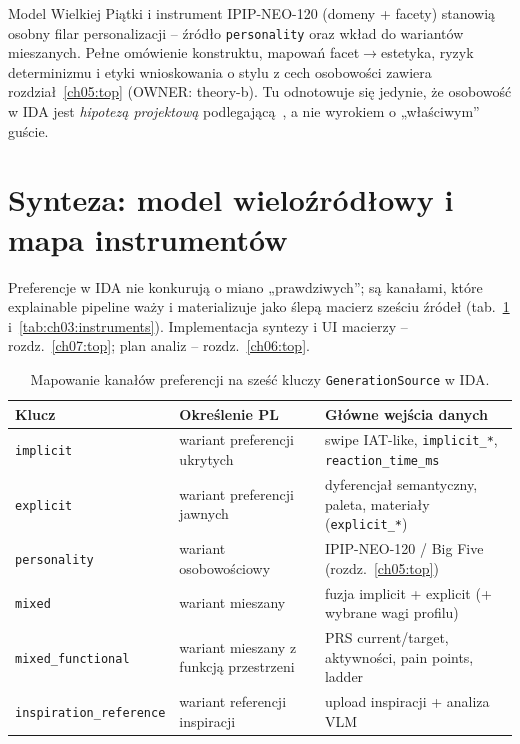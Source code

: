 Model Wielkiej Piątki i instrument IPIP-NEO-120 (domeny + facety) stanowią osobny filar personalizacji -- źródło \texttt{personality} oraz wkład do wariantów mieszanych.
Pełne omówienie konstruktu, mapowań facet$\rightarrow$estetyka, ryzyk determinizmu i etyki wnioskowania o stylu z cech osobowości zawiera rozdział~\ref{ch05:top} (OWNER: theory-b).
Tu odnotowuje się jedynie, że osobowość w IDA jest \emph{hipotezą projektową} podlegającą~, a nie wyrokiem o „właściwym” guście.

\section{Synteza: model wieloźródłowy i mapa instrumentów}
\label{ch03:sec:synteza}

Preferencje w IDA nie konkurują o miano „prawdziwych”; są kanałami, które explainable pipeline waży i materializuje jako ślepą macierz sześciu źródeł (tab.~\ref{tab:ch03:sources} i~\ref{tab:ch03:instruments}).
Implementacja syntezy i UI macierzy -- rozdz.~\ref{ch07:top}; plan analiz -- rozdz.~\ref{ch06:top}.

\begin{table}[htbp]
  \centering
  \caption{Mapowanie kanałów preferencji na sześć kluczy \texttt{GenerationSource} w IDA.}
  \label{tab:ch03:sources}
  \begin{tabular}{@{}llp{}@{}}
    \toprule
    Klucz & Określenie PL & Główne wejścia danych \\
    \midrule
    \texttt{implicit}
      & wariant preferencji ukrytych
      & swipe IAT-like, \texttt{implicit\_*}, \texttt{reaction\_time\_ms} \\
    \texttt{explicit}
      & wariant preferencji jawnych
      & dyferencjał semantyczny, paleta, materiały (\texttt{explicit\_*}) \\
    \texttt{personality}
      & wariant osobowościowy
      & IPIP-NEO-120 / Big Five (rozdz.~\ref{ch05:top}) \\
    \texttt{mixed}
      & wariant mieszany
      & fuzja implicit + explicit (+ wybrane wagi profilu) \\
    \texttt{mixed\_functional}
      & wariant mieszany z funkcją przestrzeni
      & PRS current/target, aktywności, pain points, ladder \\
    \texttt{inspiration\_reference}
      & wariant referencji inspiracji
      & upload inspiracji + analiza VLM \\
    \bottomrule
  \end{tabular}
\end{table}

